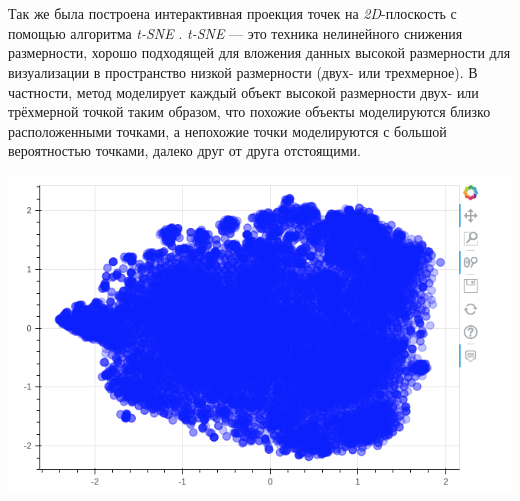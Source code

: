 $ $

$  $

Так же была построена интерактивная проекция точек на \textit{2D}-плоскость с помощью алгоритма \textit{t-SNE} \cite{bib7}. \textit{t-SNE} --- это техника нелинейного снижения размерности, хорошо подходящей для вложения данных высокой размерности для визуализации в пространство низкой размерности (двух- или трехмерное). В частности, метод моделирует каждый объект высокой размерности двух- или трёхмерной точкой таким образом, что похожие объекты моделируются близко расположенными точками, а непохожие точки моделируются с большой вероятностью точками, далеко друг от друга отстоящими.

\includegraphics[scale=0.75]{pics/points.png}